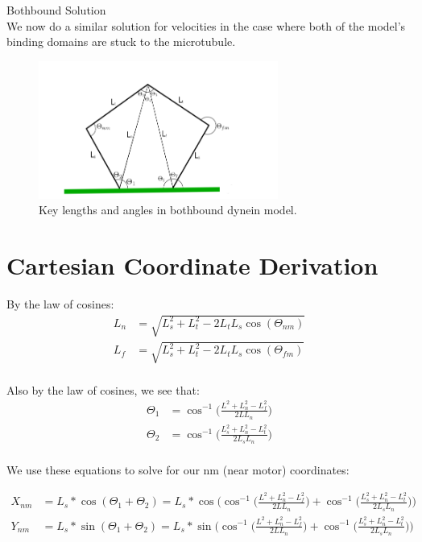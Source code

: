 \documentclass[11pt, landscape]{article}
\begin{document}
\clearpage
{\huge Bothbound Solution} \\
We now do a similar solution for velocities in the case where both of the model's binding domains are stuck to the microtubule.

\begin{figure}[h!]
  \caption{Key lengths and angles in bothbound dynein model.}
  \centering
    \includegraphics[width=0.7\textwidth]{../figures/bothbound_model.png}
\end{figure}

\section{Cartesian Coordinate Derivation}

By the law of cosines:
\begin{align}
  L_n &= \sqrt{L_{s}^2+L_{t}^2-2L_{t}L_{s}\cos(\Theta_{nm})}\\
  L_f &= \sqrt{L_{s}^2+L_{t}^2-2L_{t}L_{s}\cos(\Theta_{fm})}\\
\end{align}

Also by the law of cosines, we see that:
\begin{align}
  \Theta_{1} &= \cos^{-1}\bigg(\frac{L^2+L_{n}^2-L_{f}^2}{2LL_{n}}\bigg) \\
  \Theta_{2} &= \cos^{-1}\bigg(\frac{L_{s}^2+L_{n}^2-L_{t}^2}{2L_{s}L_{n}}\bigg) \\
\end{align}

We use these equations to solve for our nm (near motor) coordinates:

\begin{align}
  X_{nm} &= L_{s}*\cos(\Theta_{1}+\Theta_{2}) =
     L_{s}*\cos\Bigg(\cos^{-1}\bigg(\frac{L^2+L_{n}^2-L_{f}^2}{2LL_{n}}\bigg)
     + \cos^{-1}\bigg(\frac{L_{s}^2+L_{n}^2-L_{t}^2}{2L_{s}L_{n}}\bigg)\Bigg) \\
  Y_{nm} &= L_{s}*\sin(\Theta_{1}+\Theta_{2}) =
     L_{s}*\sin\Bigg(\cos^{-1}\bigg(\frac{L^2+L_{n}^2-L_{f}^2}{2LL_{n}}\bigg)
     + \cos^{-1}\bigg(\frac{L_{s}^2+L_{n}^2-L_{t}^2}{2L_{s}L_{n}}\bigg)\Bigg) \\
\end{align}
\end{document}
